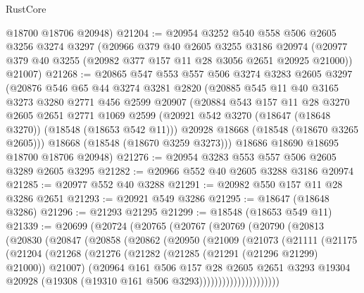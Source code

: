 \begin{lexlean}{RustCore}
\begin{coremodule}
      @18700
      @18706
      @20948)
@21204 := @20954
    @3252
    @540
    @558
    @506
    @2605
    @3256
    @3274
    @3297
    (@20966
      @379
      @40
      @2605
      @3255
      @3186
      @20974
      (@20977 @379 @40 @3255 (@20982 @377 @157 @11 @28 @3056 @2651 @20925 @21000))
      @21007)
@21268 := @20865
    @547
    @553
    @557
    @506
    @3274
    @3283
    @2605
    @3297
    (@20876
      @546
      @65
      @44
      @3274
      @3281
      @2820
      (@20885
        @545
        @11
        @40
        @3165
        @3273
        @3280
        @2771
        @456
        @2599
        @20907
        (@20884
          @543
          @157
          @11
          @28
          @3270
          @2605
          @2651
          @2771
          @1069
          @2599
          (@20921 @542 @3270 (@18647 (@18648 @3270)) (@18548 (@18653 @542 @11)))
          @20928
          @18668
          (@18548 (@18670 @3265 @2605)))
        @18668
        (@18548 (@18670 @3259 @3273)))
      @18686
      @18690
      @18695
      @18700
      @18706
      @20948)
@21276 := @20954 @3283 @553 @557 @506 @2605 @3289 @2605 @3295
@21282 := @20966 @552 @40 @2605 @3288 @3186 @20974
@21285 := @20977 @552 @40 @3288
@21291 := @20982 @550 @157 @11 @28 @3286 @2651
@21293 := @20921 @549 @3286
@21295 := @18647 (@18648 @3286)
@21296 := @21293 @21295
@21299 := @18548 (@18653 @549 @11)
@21339 := @20699
    (@20724
      (@20765
        (@20767
          (@20769
            (@20790
              (@20813
                (@20830
                  (@20847
                    (@20858
                      (@20862
                        (@20950
                          (@21009
                            (@21073
                              (@21111
                                (@21175
                                  (@21204
                                    (@21268
                                      (@21276
                                        (@21282 (@21285 (@21291 (@21296 @21299) @21000)) @21007)
                                        (@20964
                                          @161
                                          @506
                                          @157
                                          @28
                                          @2605
                                          @2651
                                          @3293
                                          @19304
                                          @20928
                                          (@19308 (@19310 @161 @506 @3293)))))))))))))))))))))

\end{coremodule}
\end{lexlean}
